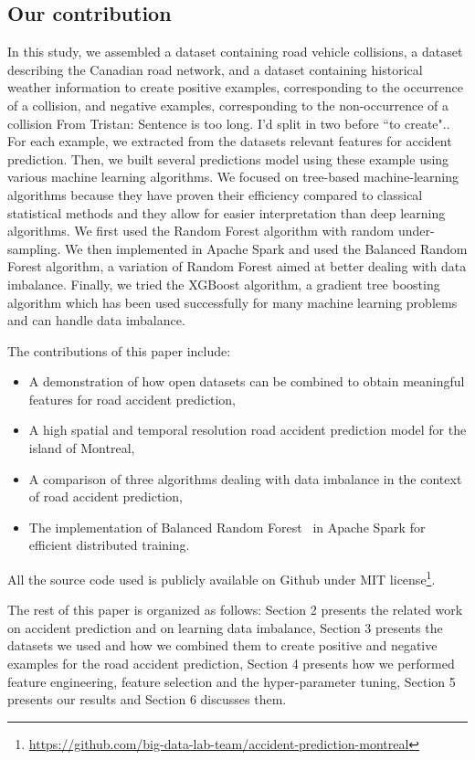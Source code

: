 \documentclass[conference]{IEEEtran}
\newcommand{\TG}[1]{\colorlet{saved}{.}\color{orange}From Tristan: #1\color{saved}}
\begin{document}
\subsection{Our contribution}

In this study, we assembled a dataset containing road vehicle collisions, a dataset describing the Canadian road network, and a dataset containing historical weather information to create positive examples, corresponding to the occurrence of a collision, and negative examples, corresponding to the non-occurrence of a collision \TG{Sentence is too long. I'd split in two before ``to create".}. For each example, we extracted from the datasets relevant features for accident prediction. Then, we built several predictions model using these example using various machine learning algorithms. We focused on tree-based machine-learning algorithms because they have proven their efficiency compared to classical statistical methods \cite{Chang2005, Chang2005b} and they allow for easier interpretation than deep learning algorithms. We first used the Random Forest algorithm with random under-sampling. We then implemented in Apache Spark and used the Balanced Random Forest algorithm\cite{Chen2004}, a variation of Random Forest aimed at better dealing with data imbalance. Finally, we  tried the XGBoost algorithm, a gradient tree boosting algorithm which has been used successfully for many machine learning problems and can handle data imbalance\cite{xgboost_doc}.

The contributions of this paper include: 
\begin{itemize}
\item A demonstration of how open datasets can be combined to obtain
meaningful features for road accident prediction,
\item A high spatial and temporal resolution road accident prediction model for the island of Montreal,
\item A comparison of three algorithms dealing with data imbalance in the context of road accident prediction,
\item The implementation of Balanced Random Forest~\cite{Chen2004} in Apache Spark for efficient distributed training.
\end{itemize}

All the source code used is publicly available on Github under MIT
license\footnote{\url{https://github.com/big-data-lab-team/accident-prediction-montreal}}.

The rest of this paper is organized as follows: Section 2 presents
the related work on accident prediction and on learning data imbalance, Section 3 presents the datasets we used and
how we combined them to create positive and negative examples for the road
accident prediction, Section 4 presents how we performed feature
engineering, feature selection and the hyper-parameter tuning, Section 5
presents our results and Section 6 discusses them.
\end{document}
